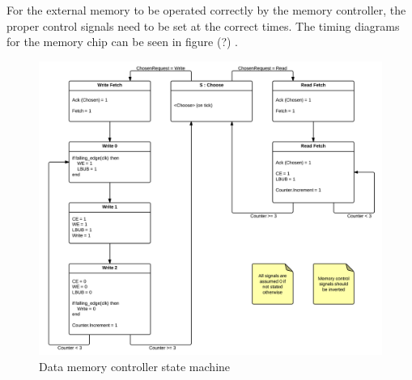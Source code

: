 For the external memory to be operated correctly by the memory controller, the proper control signals need to be set at the correct times.
The timing diagrams for the memory chip can be seen in figure (?) .

\begin{figure}

  \centering
  \includegraphics[width=\textwidth]{fpga/fig/memory_ctrl_state_machine.png}
  \caption{Data memory controller state machine}
  \label{fpga:fig:mem:data_memory_ctrl}
\end{figure}

